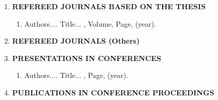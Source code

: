\listofpapers
\label{lop}
%
\begin{enumerate}[{I. }]\bfseries
	\item \textbf{REFEREED JOURNALS BASED ON THE THESIS} \\
	 	\begin{enumerate}[{1. }]\normalfont
		\item Authors....  \newblock
		Title...
		, Volume,
		Page, (year).
		\end{enumerate}
	\item \textbf{REFEREED JOURNALS (Others)} \\
	\item \textbf{PRESENTATIONS IN CONFERENCES} \\
		\begin{enumerate}[{1. }]\normalfont
		\item Authors....  \newblock
		Title...
		,
		Page, (year).
		\end{enumerate}
	\item \textbf{PUBLICATIONS IN CONFERENCE PROCEEDINGS} \\

\end{enumerate}
